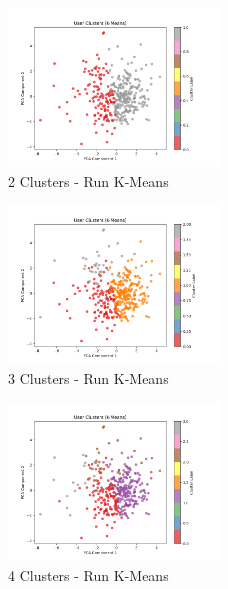 \begin{figure}[H]
  \centering
  \includegraphics[width=0.5\textwidth]{../output/run_kmeans/images/normalization/simple_centering/hard_clusters/hard_clusters_pca_c2_m2.0_kmeans_maximum_pearson.png}
  \caption{2 Clusters - Run K-Means}
  \label{fig:2_clusters_kmeans}
\end{figure}
\begin{figure}[H]
  \centering
  \includegraphics[width=0.5\textwidth]{../output/run_kmeans/images/normalization/simple_centering/hard_clusters/hard_clusters_pca_c3_m2.0_kmeans_maximum_pearson.png}
  \caption{3 Clusters - Run K-Means}
  \label{fig:3_clusters_kmeans}
\end{figure}
\begin{figure}[H]
  \centering
  \includegraphics[width=0.5\textwidth]{../output/run_kmeans/images/normalization/simple_centering/hard_clusters/hard_clusters_pca_c4_m2.0_kmeans_maximum_pearson.png}
  \caption{4 Clusters - Run K-Means}
  \label{fig:4_clusters_kmeans}
\end{figure}

